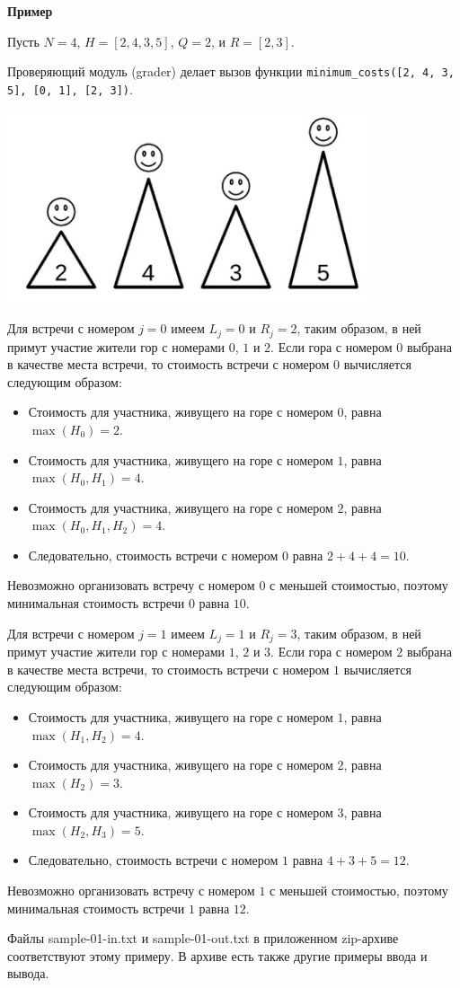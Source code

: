 \textbf{Пример}

Пусть $N=4$, $H=[2,4,3,5]$, $Q=2$, и $R=[2,3]$.

Проверяющий модуль (grader) делает вызов функции \texttt{minimum\_costs([2, 4, 3,
5], [0, 1], [2, 3])}.

\includegraphics{1.png}


Для встречи с номером $j=0$ имеем $L_j=0$ и $R_j=2$, таким образом, в ней примут
участие жители гор с номерами $0$, $1$ и $2$. Если гора с номером $0$ выбрана в качестве
места встречи, то стоимость встречи с номером $0$ вычисляется следующим
образом:
\begin{itemize}
    \item Стоимость для участника, живущего на горе с номером $0$, равна $\max(H_0)=2$.
    \item Стоимость для участника, живущего на горе с номером $1$, равна $\max(H_0, H_1)=4$.
    \item Стоимость для участника, живущего на горе с номером $2$, равна $\max(H_0, H_1, H_2)=4$.
    \item Следовательно, стоимость встречи с номером $0$ равна $2 + 4 + 4 = 10$.

\end{itemize}
Невозможно организовать встречу с номером $0$ с меньшей стоимостью, поэтому
минимальная стоимость встречи $0$ равна $10$.

Для встречи с номером $j=1$ имеем $L_j = 1$ и $R_j=3$, таким образом, в ней примут
участие жители гор с номерами $1$, $2$ и $3$. Если гора с номером $2$ выбрана в качестве
места встречи, то стоимость встречи с номером $1$ вычисляется следующим
образом:
\begin{itemize}
    \item Стоимость для участника, живущего на горе с номером $1$, равна $\max(H_1, H_2)=4$.
\item Стоимость для участника, живущего на горе с номером $2$, равна $\max(H_2)=3$.
\item Стоимость для участника, живущего на горе с номером $3$, равна $\max(H_2, H_3)=5$.
\item Следовательно, стоимость встречи с номером $1$ равна $4 + 3 + 5 = 12$.

\end{itemize}


Невозможно организовать встречу с номером $1$ с меньшей стоимостью, поэтому
минимальная стоимость встречи $1$ равна $12$.

Файлы sample-01-in.txt и sample-01-out.txt в приложенном zip-архиве
соответствуют этому примеру. В архиве есть также другие примеры ввода и
вывода.
